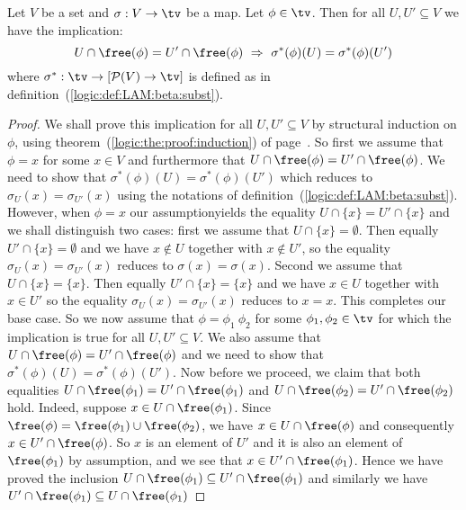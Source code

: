 \begin{prop}\label{logic:prop:LAM:freevar:beta:intersect:gen}
    Let $V$ be a set and $\sigma:V\to\tv$ be a map. Let $\phi\in\tv$.
    Then for all $U,U'\subseteq V$ we have the implication:
        \[
            U\cap\free(\phi) = U'\cap\free(\phi)
            \ \Rightarrow\ 
            \sigma^{*}(\phi)(U) = \sigma^{*}(\phi)(U')
        \]
    where $\sigma^{*}:\tv\to[{\cal P}(V)\to\tv]$ is defined as in 
    definition~(\ref{logic:def:LAM:beta:subst}).
\end{prop}
\begin{proof}
    We shall prove this implication for all $U,U'\subseteq V$  by structural 
    induction on $\phi$, using theorem~(\ref{logic:the:proof:induction}) of 
    page~\pageref{logic:the:proof:induction}. So first we assume that $\phi=x$
    for some $x\in V$ and furthermore that $U\cap\free(\phi) = U'\cap\free(\phi)$.
    We need to show that $\sigma^{*}(\phi)(U)=\sigma^{*}(\phi)(U')$ which 
    reduces to $\sigma_{U}(x)=\sigma_{U'}(x)$ using the notations of
    definition~(\ref{logic:def:LAM:beta:subst}). However, when $\phi=x$ our 
    assumptionyields the equality $U\cap\{x\}=U'\cap\{x\}$ and we shall distinguish 
    two cases: first we assume that $U\cap\{x\}=\emptyset$. Then equally 
    $U'\cap\{x\}=\emptyset$ and we have $x\not\in U$ together with $x\not\in U'$,
    so the equality $\sigma_{U}(x)=\sigma_{U'}(x)$ reduces to 
    $\sigma(x)=\sigma(x)$. Second we assume that $U\cap\{x\}=\{x\}$. Then
    equally $U'\cap\{x\}=\{x\}$ and we have $x\in U$ together with $x\in U'$
    so the equality $\sigma_{U}(x)=\sigma_{U'}(x)$ reduces to $x = x$.
    This completes our base case. So we now assume that $\phi=\phi_{1}\ \phi_{2}$
    for some $\phi_{1}, \phi_{2}\in\tv$ for which the implication is true for
    all $U,U'\subseteq V$. We also assume that 
    $U\cap\free(\phi)=U'\cap\free(\phi)$
    and we need to show that $\sigma^{*}(\phi)(U)=\sigma^{*}(\phi)(U')$. Now
    before we proceed, we claim that both equalities 
    $U\cap\free(\phi_{1})=U'\cap\free(\phi_{1})$ and 
    $U\cap\free(\phi_{2})=U'\cap\free(\phi_{2})$ hold. Indeed, suppose
    $x\in U\cap\free(\phi_{1})$. Since 
    $\free(\phi)=\free(\phi_{1})\cup\free(\phi_{2})$, we have 
    $x\in U\cap\free(\phi)$ and consequently $x\in U'\cap\free(\phi)$.
    So $x$ is an element of $U'$ and it is also an element of $\free(\phi_{1})$
    by assumption, and we see that $x\in U'\cap\free(\phi_{1})$. Hence we have
    proved the inclusion $U\cap\free(\phi_{1})\subseteq U'\cap\free(\phi_{1})$
    and similarly we have $U'\cap\free(\phi_{1})\subseteq U\cap\free(\phi_{1})$

\end{proof}
